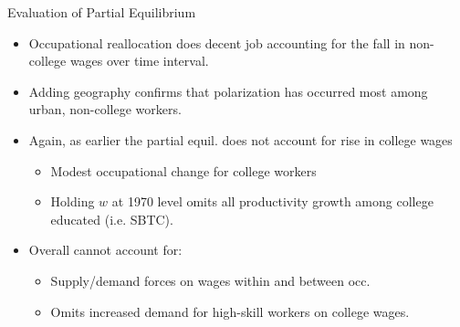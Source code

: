 \documentclass{beamer}
\begin{document}
\begin{frame}{Evaluation of Partial Equilibrium}

\begin{itemize}
	
	\item Occupational reallocation does decent job accounting for the fall in non-college wages over time interval.
	
	\bigskip
	
	\item Adding geography confirms that polarization has occurred most among urban, non-college workers.
	
	\bigskip
	
	\item Again, as earlier the partial equil. does not account for rise in college wages
	\begin{itemize}
		\item Modest occupational change for college workers
		\item Holding $w$ at 1970 level omits all productivity growth among college educated (i.e. SBTC).
	\end{itemize}

	\bigskip
	
	\item Overall cannot account for:
	\begin{itemize}
		\item Supply/demand forces on wages within and between occ.
		\item Omits increased demand for high-skill workers on college wages.
	\end{itemize}
	
\end{itemize}

\end{frame}
\end{document}

